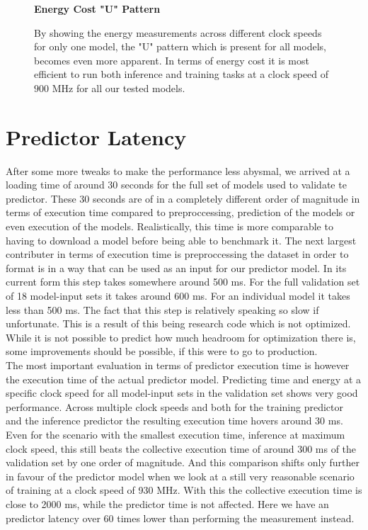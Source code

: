 \begin{figure}[htbp]
    \centering
    \parbox{0.7\textwidth}{\centering\textbf{Energy Cost "U" Pattern}}
    \caption{By showing the energy measurements across different clock speeds for only one model, the "U" pattern which is present for all models, becomes even more apparent. In terms of energy cost it is most efficient to run both inference and training tasks at a clock speed of $900$ MHz for all our tested models.}
    \label{fig:pattern}
\end{figure}

\section{Predictor Latency}


After some more tweaks to make the performance less abysmal, we arrived at a loading time of around 30 seconds for the full set of models used to validate te predictor. These 30 seconds are of in a completely different order of magnitude in terms of execution time compared to preproccessing, prediction of the models or even execution of the models. Realistically, this time is more comparable to having to download a model before being able to benchmark it. The next largest contributer in terms of execution time is preproccessing the dataset in order to format is in a way that can be used as an input for our predictor model. In its current form this step takes somewhere around 500 ms. For the full validation set of 18 model-input sets it takes around 600 ms. For an individual model it takes less than 500 ms. The fact that this step is relatively speaking so slow if unfortunate. This is a result of this being research code which is not optimized. While it is not possible to predict how much headroom for optimization there is, some improvements should be possible, if this were to go to production. \\
The most important evaluation in terms of predictor execution time is however the execution time of the actual predictor model. Predicting time and energy at a specific clock speed for all model-input sets in the validation set shows very good performance. Across multiple clock speeds and both for the training predictor and the inference predictor the resulting execution time hovers around 30 ms. Even for the scenario with the smallest execution time, inference at maximum clock speed, this still beats the collective execution time of around 300 ms of the validation set by one order of magnitude. And this comparison shifts only further in favour of the predictor model when we look at a still very reasonable scenario of training at a clock speed of 930 MHz. With this the collective execution time is close to 2000 ms, while the predictor time is not affected. Here we have an predictor latency over 60 times lower than performing the measurement instead.

